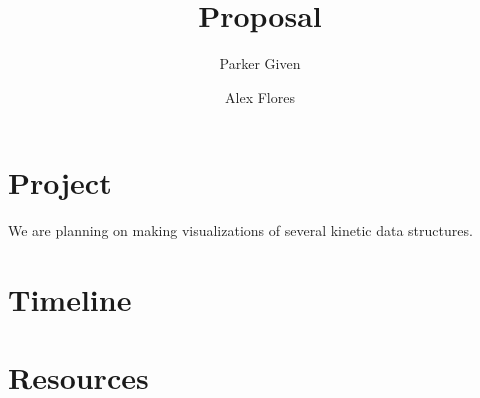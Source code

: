 \documentclass[secnumarabic,amssymb, nobibnotes, aps, pra]{revtex4}
\begin{document}
\title{Proposal}
\author{Parker Given}
\author{Alex Flores}

\maketitle

\section{Project}
We are planning on making visualizations of several kinetic data structures.
\section{Timeline}

\section{Resources}
\end{document}

